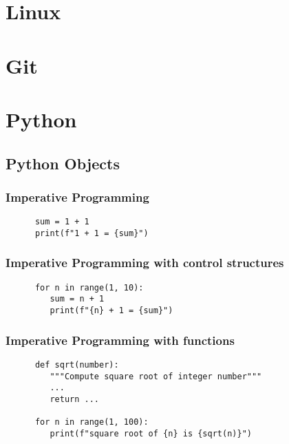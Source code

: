 



\begin{frame}
   \titlepage
\end{frame}

\begin{frame}
   \tableofcontents
\end{frame}

\section{Linux}
\section{Git}
\section{Python}

\subsection{Python Objects}


\begin{frame}[fragile]
\frametitle{Imperative Programming}
   \begin{verbatim}
      sum = 1 + 1
      print(f"1 + 1 = {sum}")
   \end{verbatim}
\end{frame}

\begin{frame}[fragile]
\frametitle{Imperative Programming with control structures}
   \begin{verbatim}
      for n in range(1, 10):
         sum = n + 1
         print(f"{n} + 1 = {sum}")
   \end{verbatim}
\end{frame}

\begin{frame}[fragile]
\frametitle{Imperative Programming with functions}
   \begin{verbatim}
      def sqrt(number):
         """Compute square root of integer number"""
         ...
         return ...

      for n in range(1, 100):
         print(f"square root of {n} is {sqrt(n)}")
   \end{verbatim}
\end{frame}

